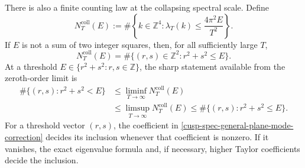 \begin{proposition}
There is also a finite counting law at the collapsing spectral scale.  Define
\begin{equation}
 N_T^{\mathrm{coll}}(E)
 :=\#\left\{k\in\mathbb Z^4:
       \lambda_T(k)\le\frac{4\pi^2E}{T^2}\right\}.
 \label{cusp-spec-collapsing-count-definition}
\end{equation}
If \(E\) is not a sum of two integer squares, then, for all sufficiently
large \(T\),
\begin{equation}
 N_T^{\mathrm{coll}}(E)
 =\#\{(r,s)\in\mathbb Z^2:r^2+s^2\le E\}.
 \label{cusp-spec-collapsing-count}
\end{equation}
At a threshold \(E\in\{r^2+s^2:r,s\in\mathbb Z\}\), the sharp statement
available from the zeroth-order limit is
\begin{equation}
 \begin{split}
 \#\{(r,s):r^2+s^2<E\}
 &\le\liminf_{T\to\infty}N_T^{\mathrm{coll}}(E)\\
 &\le\limsup_{T\to\infty}N_T^{\mathrm{coll}}(E)
 \le\#\{(r,s):r^2+s^2\le E\}.
 \end{split}
 \label{cusp-spec-threshold-count}
\end{equation}
For a threshold vector \((r,s)\), the coefficient in
\cref{cusp-spec-general-plane-mode-correction} decides its inclusion whenever
that coefficient is nonzero.  If it vanishes, the exact eigenvalue formula
and, if necessary, higher Taylor coefficients decide the inclusion.
\end{proposition}

